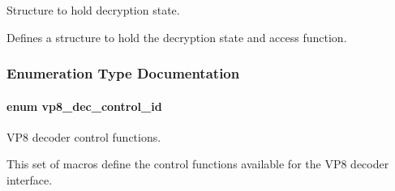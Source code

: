\-Structure to hold decryption state. 

\-Defines a structure to hold the decryption state and access function. 

\subsubsection{\-Enumeration \-Type \-Documentation}
\hypertarget{group__vp8__decoder_gaf9dd3f2e6d1412106ee791af768e57c1}{
\paragraph[{vp8\-\_\-dec\-\_\-control\-\_\-id}]{\setlength{\rightskip}{0pt plus 5cm}enum {\bf vp8\-\_\-dec\-\_\-control\-\_\-id}}}\label{group__vp8__decoder_gaf9dd3f2e6d1412106ee791af768e57c1}


\-V\-P8 decoder control functions. 

\-This set of macros define the control functions available for the \-V\-P8 decoder interface.

